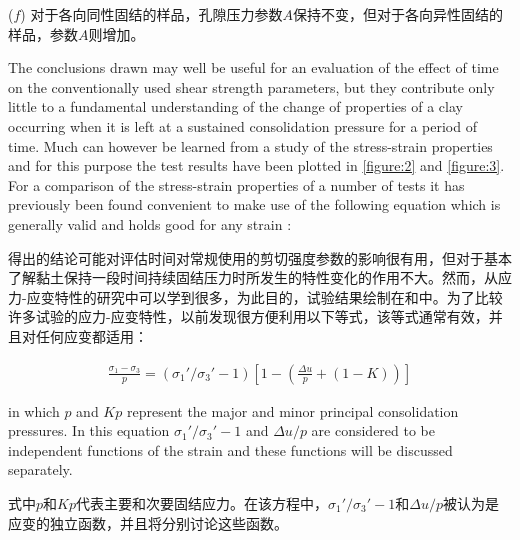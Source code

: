 \begin{paracol}{2}
   ($f$) 对于各向同性固结的样品，孔隙压力参数$A$保持不变，但对于各向异性固结的样品，参数$A$则增加。

   \switchcolumn*

   The conclusions drawn may well be useful for an evaluation of the effect of time on the conventionally used shear strength parameters, but they contribute only little to a fundamental understanding of the change of properties of a clay occurring when it is left at a sustained consolidation pressure for a period of time. Much can however be learned from a study of the stress-strain properties and for this purpose the test results have been plotted in \autoref{figure:2} and \autoref{figure:3}. For a comparison of the stress-strain properties of a number of tests it has previously been found convenient to make use of the following equation which is generally valid and holds good for any strain :

   \switchcolumn

   得出的结论可能对评估时间对常规使用的剪切强度参数的影响很有用，但对于基本了解黏土保持一段时间持续固结压力时所发生的特性变化的作用不大。然而，从应力-应变特性的研究中可以学到很多，为此目的，试验结果绘制在和中。为了比较许多试验的应力-应变特性，以前发现很方便利用以下等式，该等式通常有效，并且对任何应变都适用： 

\end{paracol}

\begin{align}
    \frac{\sigma_1-\sigma_3}{p}=(\sigma_1'/\sigma_3'-1)\left[1-\left(\frac{\Delta{u}}{p}+(1-K)\right)\right]
\end{align}


\begin{paracol}{2}
    
    \noindent in which $p$ and $Kp$ represent the major and minor principal consolidation pressures. In this equation $\sigma_1'/\sigma_3'-1$ and $\Delta{u}/p$ are considered to be independent functions of the strain and these functions will be discussed separately.

    \switchcolumn

    \noindent 式中$p$和$Kp$代表主要和次要固结应力。在该方程中，$\sigma_1'/\sigma_3'-1$和$\Delta{u}/p$被认为是应变的独立函数，并且将分别讨论这些函数。

\end{paracol}